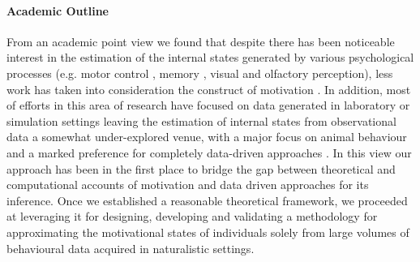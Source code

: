 \paragraph*{Academic Outline}
\label{academic_outline}
From an academic point view we found that despite there has been noticeable interest in the estimation of the internal states generated by various psychological processes (e.g. motor control \cite{gallego2017neural}, memory \cite{derdikman2011manifold, nieh2021geometry}, visual \cite{seung2000manifold, ganmor2015thesaurus} and olfactory \cite{stopfer2003intensity} perception), less work has taken into consideration the construct of motivation \cite{mcclure2003computational, zhang2009neural}. In addition, most of efforts in this area of research have focused on data generated in laboratory or simulation settings \cite{eyjolfsdottir2016learning, song2017reward, merel2019deep,calhoun2019unsupervised, seung2000manifold, pang2016dimensionality, luxem2020identifying, pereira2020quantifying, mccullough2021unsupervised, shi2021learning} leaving the estimation of internal states from observational data a somewhat under-explored venue, with a major focus on animal behaviour and a marked preference for completely data-driven approaches \cite{luxem2020identifying,pereira2020quantifying, mccullough2021unsupervised}. In this view our approach has been in the first place to bridge the gap between theoretical and computational accounts of motivation and data driven approaches for its inference. Once we established a reasonable theoretical framework, we proceeded at leveraging it for designing, developing and validating a methodology for approximating the motivational states of individuals solely from large volumes of behavioural data acquired in naturalistic settings. 

